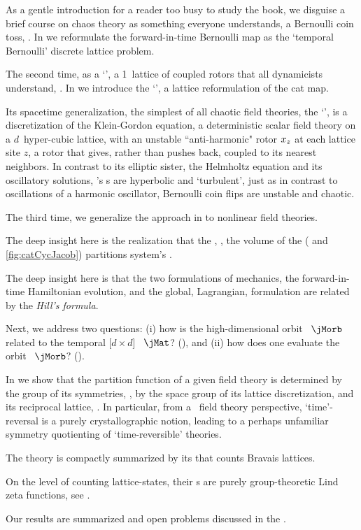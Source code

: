 As a gentle introduction
for a reader too busy to study the book, we
disguise a brief course on chaos theory as something everyone
understands, a Bernoulli coin toss, . In
 we reformulate the forward-in-time Bernoulli map as
the `{temporal Bernoulli}' discrete lattice problem.

The second time,
as a `\templatt', a 1\dmn\ lattice of coupled rotors that all dynamicists
understand, . In  we introduce
the `\templatt', a lattice reformulation of the cat map.

Its spacetime generalization, the simplest of all chaotic field theories,
the `\catlatt', is a discretization of the
Klein-Gordon equation, a deterministic scalar field theory on a $d$\dmn\
hyper-cubic lattice, with an unstable ``anti-harmonic" rotor $x_{z}$
at each lattice site $z$, a rotor that gives, rather than pushes back,
coupled to its nearest neighbors.
In contrast to its elliptic sister, the Helmholtz equation and its
oscillatory solutions, {\catlatt}'s {\lattstate}s are hyperbolic and
`turbulent', just as in contrast to oscillations of a harmonic
oscillator, Bernoulli coin flips are unstable and chaotic.

The third time,
we generalize the approach in  %
to nonlinear field theories.

The deep insight
here is the realization that the {\em\HillDet}, \ie, the volume of the
{\em\jacobianOrb} (\reffig{fig:BernCyc2Jacob} and \ref{fig:catCycJacob})
partitions system's \statesp.

The deep insight here is that the two formulations of mechanics, the
forward-in-time Hamiltonian evolution, and the global, Lagrangian,
{\templatt} formulation are related by the {\em Hill's formula}.

Next, we address two questions:
(i) how is the high-dimensional orbit \jacobianM\ $\jMorb$ related
to the temporal [$d\!\times\!d$] \jacobianM\ $\jMat$?
(),
and
(ii) how does one evaluate the orbit \jacobianM\ $\jMorb$?
().


In  we show that the partition function of a
given field theory is determined by the group of its symmetries, \ie,
by the space group of its lattice discretization,
and its reciprocal lattice, .
In particular, from a \spt\ field theory perspective, `time'-reversal is
a purely crystallographic notion, leading to a perhaps unfamiliar
symmetry quotienting of `time-reversible' theories.

The theory is compactly summarized by its {\tzeta} 
that counts Bravais lattices.

On the level of counting lattice-states, their {\tzeta}s are purely
group-theoretic Lind zeta functions, see \refsect{sect:LC21Lind1d}.

Our results are summarized and open problems discussed in the
.
